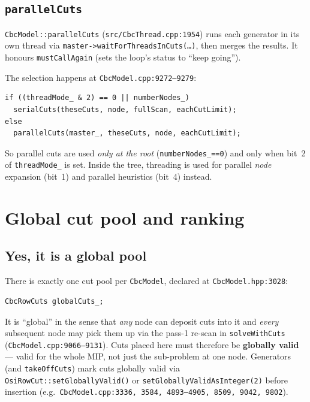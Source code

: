 \documentclass[11pt,a4paper]{article}
\begin{document}
\subsection*{\texttt{parallelCuts}}

\texttt{CbcModel::parallelCuts} (\texttt{src/CbcThread.cpp:1954})
runs each generator in its own thread via
\texttt{master->waitForThreadsInCuts(\dots)}, then merges the
results.  It honours \texttt{mustCallAgain} (sets the loop's status
to ``keep going'').

The selection happens at \texttt{CbcModel.cpp:9272--9279}:

\begin{lstlisting}
if ((threadMode_ & 2) == 0 || numberNodes_)
  serialCuts(theseCuts, node, fullScan, eachCutLimit);
else
  parallelCuts(master_, theseCuts, node, eachCutLimit);
\end{lstlisting}

So parallel cuts are used \emph{only at the root} (\texttt{numberNodes\_==0})
and only when bit~2 of \texttt{threadMode\_} is set.  Inside the
tree, threading is used for parallel \emph{node} expansion (bit~1)
and parallel heuristics (bit~4) instead.

\section{Global cut pool and ranking}
\label{sec:cutpool}

\subsection*{Yes, it is a global pool}

There is exactly one cut pool per \texttt{CbcModel}, declared at
\texttt{CbcModel.hpp:3028}:

\begin{lstlisting}
CbcRowCuts globalCuts_;
\end{lstlisting}

It is ``global'' in the sense that \emph{any} node can deposit cuts
into it and \emph{every} subsequent node may pick them up via the
pass-1 re-scan in \texttt{solveWithCuts}
(\texttt{CbcModel.cpp:9066--9131}).  Cuts placed here must therefore
be \textbf{globally valid} --- valid for the whole MIP, not just the
sub-problem at one node.  Generators (and \texttt{takeOffCuts})
mark cuts globally valid via
\texttt{OsiRowCut::setGloballyValid()} or
\texttt{setGloballyValidAsInteger(2)} before insertion (e.g.\
\texttt{CbcModel.cpp:3336, 3584, 4893--4905, 8509, 9042, 9802}).
\end{document}

